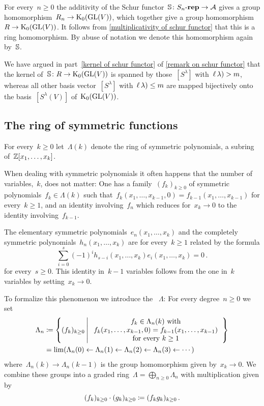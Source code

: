 \documentclass[a4paper,10pt]{scrartcl}
\begin{document}
For every~$n \geq 0$ the additivity of the Schur functor~$\mathbb{S} \colon S_n\text{-}\mathbf{rep} \to \mathcal{A}$ gives a group homomorphism~$R_n \to \operatorname{K}_0(\operatorname{GL}(V))$, which together give a group homomorphism~$R \to \operatorname{K}_0(\operatorname{GL}(V))$.
It follows from \cref{multiplicativity of schur functor} that this is a ring homomorphism.
By abuse of notation we denote this homomorphism again by~$\mathbb{S}$.

We have argued in part~\ref{kernel of schur functor} of \cref{remark on schur functor} that the kernel of~$\mathbb{S} \colon R \to \operatorname{K}_0(\operatorname{GL}(V))$ is spanned by those~$[S^\lambda]$ with~$\operatorname{\ell}\lambda) > m$, whereas all other basis vector~$[S^\lambda]$ with~$\operatorname{\ell}\lambda) \leq m$ are mapped bijectively onto the basis~$[S^\lambda(V)]$ of~$\operatorname{K}_0(\operatorname{GL}(V))$.


\subsection{The ring of symmetric functions}

For every~$k \geq 0$ let~$\Lambda(k)$ denote the ring of symmetric polynomials, a subring of~$\mathbb{Z}[x_1, \dotsc, x_k]$.

When dealing with symmetric polynomials it often happens that the number of variables,~$k$, does not matter:
One has a family~$(f_k)_{k \geq 0}$ of symmetric polynomials~$f_k \in \Lambda(k)$ such that~$f_k(x_1, \dotsc, x_{k-1}, 0) = f_{k-1}(x_1, \dotsc, x_{k-1})$ for every~$k \geq 1$, and an identity involving~$f_n$ which reduces for~$x_k \to 0$ to the identity involving~$f_{k-1}$.

\begin{example}
  The elementary symmetric polynomials~$e_n(x_1, \dotsc, x_k)$ and the completely symmetric polynomials~$h_n(x_1, \dotsc, x_k)$ are for every~$k \geq 1$ related by the formula
  \[
    \sum_{i=0}^s (-1)^i h_{s-i}(x_1, \dotsc, x_k) e_i(x_1, \dotsc, x_k) = 0 \,.
  \]
  for every~$s \geq 0$.
  This identity in~$k-1$ variables follows from the one in~$k$ variables by setting~$x_k \to 0$.
\end{example}

To formalize this phenomenon we introduce the ~$\Lambda$:
For every degree~$n \geq 0$ we set
\begin{align*}
  \Lambda_n
  &\defined
  \left\{
    (f_k)_{k \geq 0}
  \suchthat*
    \begin{tabular}{c}
      $f_k \in \Lambda_n(k)$ with \\
      $f_k(x_1, \dotsc, x_{k-1}, 0) = f_{k-1}(x_1, \dotsc, x_{k-1})$ \\
      for every~$k \geq 1$
    \end{tabular}
  \right\}
  \\
  &=
  \lim( \Lambda_n(0) \from \Lambda_n(1) \from \Lambda_n(2) \from \Lambda_n(3) \from \dotsb)
\end{align*}
where~$\Lambda_n(k) \to \Lambda_n(k-1)$ is the group homomorphism given by~$x_k \to 0$.
We combine these groups into a graded ring~$\Lambda = \bigoplus_{n \geq 0} \Lambda_n$ with multiplication given by
\[
  (f_k)_{k \geq 0} \cdot (g_k)_{k \geq 0}
  \coloneqq
  (f_k g_k)_{k \geq 0} \,.
\]
\end{document}
